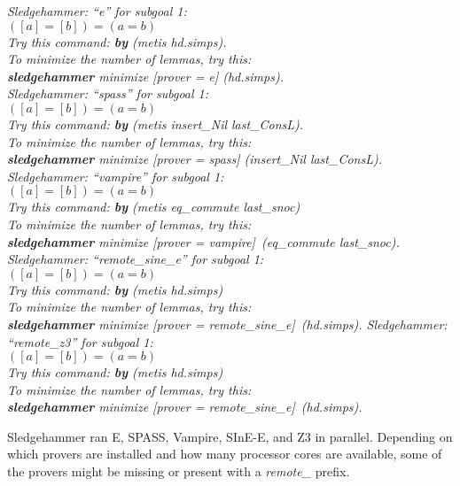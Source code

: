 \documentclass[a4paper,12pt]{article}
\begin{document}
\prew
\slshape
Sledgehammer: ``\textit{e}'' for subgoal 1: \\
$([a] = [b]) = (a = b)$ \\
Try this command: \textbf{by} (\textit{metis hd.simps}). \\
To minimize the number of lemmas, try this: \\
\textbf{sledgehammer} \textit{minimize} [\textit{prover} = \textit{e}] (\textit{hd.simps}). \\[3\smallskipamount]
%
Sledgehammer: ``\textit{spass}'' for subgoal 1: \\
$([a] = [b]) = (a = b)$ \\
Try this command: \textbf{by} (\textit{metis insert\_Nil last\_ConsL}). \\
To minimize the number of lemmas, try this: \\
\textbf{sledgehammer} \textit{minimize} [\textit{prover} = \textit{spass}] (\textit{insert\_Nil last\_ConsL}). \\[3\smallskipamount]
%
Sledgehammer: ``\textit{vampire}'' for subgoal 1: \\
$([a] = [b]) = (a = b)$ \\
Try this command: \textbf{by} (\textit{metis eq\_commute last\_snoc}) \\
To minimize the number of lemmas, try this: \\
\textbf{sledgehammer} \textit{minimize} [\textit{prover} = \textit{vampire}]~(\textit{eq\_commute last\_snoc}). \\[3\smallskipamount]
%
Sledgehammer: ``\textit{remote\_sine\_e}'' for subgoal 1: \\
$([a] = [b]) = (a = b)$ \\
Try this command: \textbf{by} (\textit{metis hd.simps}) \\
To minimize the number of lemmas, try this: \\
\textbf{sledgehammer} \textit{minimize} [\textit{prover} = \textit{remote\_sine\_e}]~(\textit{hd.simps}).
%
Sledgehammer: ``\textit{remote\_z3}'' for subgoal 1: \\
$([a] = [b]) = (a = b)$ \\
Try this command: \textbf{by} (\textit{metis hd.simps}) \\
To minimize the number of lemmas, try this: \\
\textbf{sledgehammer} \textit{minimize} [\textit{prover} = \textit{remote\_sine\_e}]~(\textit{hd.simps}).
\postw

Sledgehammer ran E, SPASS, Vampire, SInE-E, and Z3 in parallel. Depending on
which provers are installed and how many processor cores are available, some of
the provers might be missing or present with a \textit{remote\_} prefix.
\end{document}
